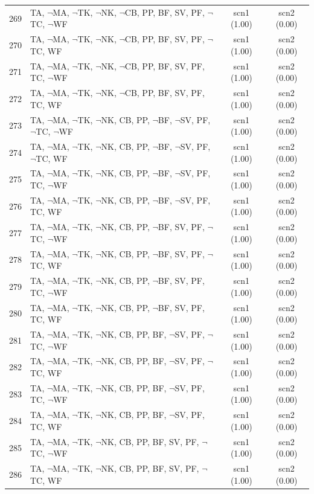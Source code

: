 \documentclass[12pt]{article}
\begin{document}
\begin{longtable}{|l|l|c|c|}
269 & TA, $\neg$MA, $\neg$TK, $\neg$NK, $\neg$CB, PP, BF, SV, PF, $\neg$TC, $\neg$WF & scn1 (1.00) & scn2 (0.00)\\
270 & TA, $\neg$MA, $\neg$TK, $\neg$NK, $\neg$CB, PP, BF, SV, PF, $\neg$TC, WF & scn1 (1.00) & scn2 (0.00)\\
271 & TA, $\neg$MA, $\neg$TK, $\neg$NK, $\neg$CB, PP, BF, SV, PF, TC, $\neg$WF & scn1 (1.00) & scn2 (0.00)\\
272 & TA, $\neg$MA, $\neg$TK, $\neg$NK, $\neg$CB, PP, BF, SV, PF, TC, WF & scn1 (1.00) & scn2 (0.00)\\
273 & TA, $\neg$MA, $\neg$TK, $\neg$NK, CB, PP, $\neg$BF, $\neg$SV, PF, $\neg$TC, $\neg$WF & scn1 (1.00) & scn2 (0.00)\\
274 & TA, $\neg$MA, $\neg$TK, $\neg$NK, CB, PP, $\neg$BF, $\neg$SV, PF, $\neg$TC, WF & scn1 (1.00) & scn2 (0.00)\\
275 & TA, $\neg$MA, $\neg$TK, $\neg$NK, CB, PP, $\neg$BF, $\neg$SV, PF, TC, $\neg$WF & scn1 (1.00) & scn2 (0.00)\\
276 & TA, $\neg$MA, $\neg$TK, $\neg$NK, CB, PP, $\neg$BF, $\neg$SV, PF, TC, WF & scn1 (1.00) & scn2 (0.00)\\
277 & TA, $\neg$MA, $\neg$TK, $\neg$NK, CB, PP, $\neg$BF, SV, PF, $\neg$TC, $\neg$WF & scn1 (1.00) & scn2 (0.00)\\
278 & TA, $\neg$MA, $\neg$TK, $\neg$NK, CB, PP, $\neg$BF, SV, PF, $\neg$TC, WF & scn1 (1.00) & scn2 (0.00)\\
279 & TA, $\neg$MA, $\neg$TK, $\neg$NK, CB, PP, $\neg$BF, SV, PF, TC, $\neg$WF & scn1 (1.00) & scn2 (0.00)\\
280 & TA, $\neg$MA, $\neg$TK, $\neg$NK, CB, PP, $\neg$BF, SV, PF, TC, WF & scn1 (1.00) & scn2 (0.00)\\
281 & TA, $\neg$MA, $\neg$TK, $\neg$NK, CB, PP, BF, $\neg$SV, PF, $\neg$TC, $\neg$WF & scn1 (1.00) & scn2 (0.00)\\
282 & TA, $\neg$MA, $\neg$TK, $\neg$NK, CB, PP, BF, $\neg$SV, PF, $\neg$TC, WF & scn1 (1.00) & scn2 (0.00)\\
283 & TA, $\neg$MA, $\neg$TK, $\neg$NK, CB, PP, BF, $\neg$SV, PF, TC, $\neg$WF & scn1 (1.00) & scn2 (0.00)\\
284 & TA, $\neg$MA, $\neg$TK, $\neg$NK, CB, PP, BF, $\neg$SV, PF, TC, WF & scn1 (1.00) & scn2 (0.00)\\
285 & TA, $\neg$MA, $\neg$TK, $\neg$NK, CB, PP, BF, SV, PF, $\neg$TC, $\neg$WF & scn1 (1.00) & scn2 (0.00)\\
286 & TA, $\neg$MA, $\neg$TK, $\neg$NK, CB, PP, BF, SV, PF, $\neg$TC, WF & scn1 (1.00) & scn2 (0.00)\\

\end{longtable}
\end{document}
